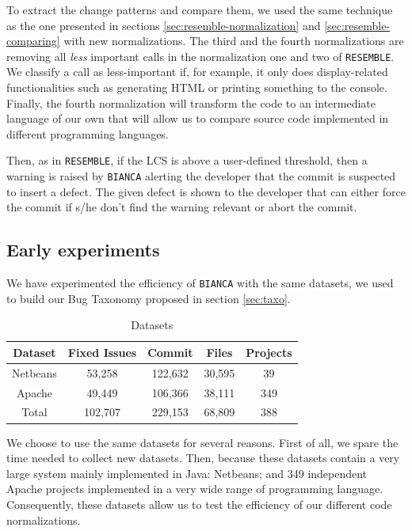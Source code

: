To extract the change patterns and compare them, we used the same technique as the one presented in sections \ref{sec:resemble-normalization} and \ref{sec:resemble-comparing} with new normalizations.
The third and the fourth normalizations are removing all {\it less} important calls in the normalization one and two of {\tt RESEMBLE}.
We classify a call as less-important if, for example, it only does display-related functionalities such as generating HTML or printing something to the console. Finally, the fourth normalization will transform the code to an intermediate language of our own that will allow us to compare source code implemented in different programming languages.

Then, as in {\tt RESEMBLE}, if the LCS is above a user-defined threshold, then a warning is raised by {\tt BIANCA} alerting the developer that the commit is suspected to insert a defect. The given defect is shown to the developer that can either force the commit if s/he don't find the warning relevant or abort the commit.


\subsection{Early experiments}

We have experimented the efficiency of {\tt BIANCA} with the same datasets, we used to build our Bug Taxonomy proposed in section \ref{sec:taxo}.

\begin{table}[h]
\begin{center}
\begin{tabular}{@{}c|c|c|c|c@{}}
\textbf{Dataset} & \textbf{Fixed Issues} & \textbf{Commit} & \textbf{Files} & \textbf{Projects} \\ \hline \hline
Netbeans         & 53,258          & 122,632     & 30,595         & 39                \\
Apache           & 49,449          & 106,366     & 38,111         & 349               \\
Total            & 102,707         & 229,153     & 68,809         & 388               \\ \hline \hline

\end{tabular}
\end{center}

\caption{Datasets\label{table:datasets-bianca}}
\end{table}

We choose to use the same datasets for several reasons. First of all, we spare the time needed to collect new datasets. Then, because these datasets contain a very large system mainly implemented in Java: Netbeans; and 349 independent Apache projects implemented in a very wide range of programming language. Consequently, these datasets allow us to test the efficiency of our different code normalizations.


